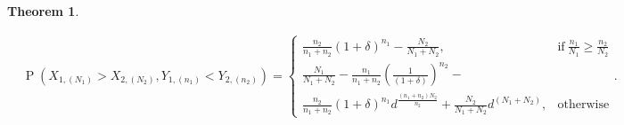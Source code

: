 \documentclass[12pt]{article}
\DeclareMathOperator*{\Prob}{P}
\newtheorem{theorem}{Theorem}[section]
\begin{document}
\begin{theorem} \label{theorem:uniformgeneral}

\begin{align*}
	&\Prob\left(X_{1,(N_1)} > X_{2,(N_2)}, Y_{1,(n_1)} < Y_{2,(n_2)}\right) 
  = \begin{cases}
      \frac{n_2}{n_1 + n_2}(1+\delta)^{n_1} - \frac{N_2}{N_1 + N_2}, & \text{if}\ \frac{n_1}{N_1} \geq \frac{n_2}{N_2} \\
      \frac{N_1}{N_1+N_2} - \frac{n_1}{n_1+n_2}(\frac{1}{(1+\delta)})^{n_2} - \\\frac{n_2}{n_1+n_2}(1+\delta)^{n_1}d^\frac{(n_1 + n_2)N_2}{n_2} + \frac{N_2}{N_1+N_2}d^{(N_1 + N_2)}, & \text{otherwise}
    \end{cases}.
\end{align*}

\end{theorem}



\end{document}
